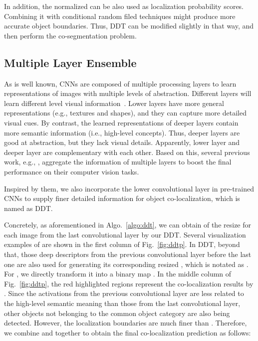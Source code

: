 \documentclass[twocolumn]{svjour3}          \smartqed  \usepackage{graphicx}
\begin{document}
In addition, the normalized  can be also used as localization probability scores. Combining it with conditional random filed techniques might produce more accurate object boundaries. Thus, DDT can be modified slightly in that way, and then perform the co-segmentation problem.

\subsection{Multiple Layer Ensemble}

As is well known, CNNs are composed of multiple processing layers to learn representations of images with multiple levels of abstraction. Different layers will learn different level visual information~\citep{visualcnn2014}. Lower layers have more general representations (e.g., textures and shapes), and they can capture more detailed visual cues. By contrast, the learned representations of deeper layers contain more semantic information (i.e., high-level concepts). Thus, deeper layers are good at abstraction, but they lack visual details. Apparently, lower layer and deeper layer are complementary with each other. Based on this, several previous work, e.g., \citet{Bharath15CVPR,Jonathan15CVPR}, aggregate the information of multiple layers to boost the final performance on their computer vision tasks.

Inspired by them, we also incorporate the lower convolutional layer in pre-trained CNNs to supply finer detailed information for object co-localization, which is named as {DDT}.

Concretely, as aforementioned in Algo.~\ref{algo:ddt}, we can obtain  of the resize  for each image from the last convolutional layer by our DDT. Several visualization examples of  are shown in the first column of Fig.~\ref{fig:ddtp}. In DDT, beyond that, those deep descriptors from the previous convolutional layer before the last one are also used for generating its corresponding resized , which is notated as . For , we directly transform it into a binary map . In the middle column of Fig.~\ref{fig:ddtp}, the red highlighted regions represent the co-localization results by . Since the activations from the previous convolutional layer are less related to the high-level semantic meaning than those from the last convolutional layer, other objects not belonging to the common object category are also being detected. However, the localization boundaries are much finer than . Therefore, we combine  and  together to obtain the final co-localization prediction as follows:
\end{document}
